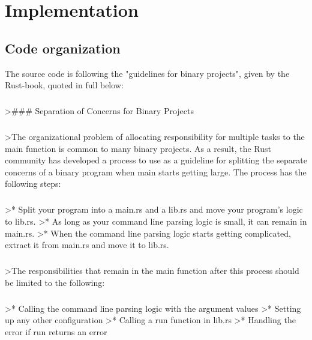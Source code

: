 \chapter{Implementation}

\section{Code organization}

The source code is following the "guidelines for binary projects", given by the Rust-book, quoted in full below:


\paragraph{}
>### Separation of Concerns for Binary Projects

\paragraph{}
>The organizational problem of allocating responsibility for multiple tasks to the main function is common to many binary projects. As a result, the Rust community has developed a process to use as a guideline for splitting the separate concerns of a binary program when main starts getting large. The process has the following steps:


\paragraph{}
>* Split your program into a main.rs and a lib.rs and move your program’s logic to lib.rs.
>* As long as your command line parsing logic is small, it can remain in main.rs.
>* When the command line parsing logic starts getting complicated, extract it from main.rs and move it to lib.rs.


\paragraph{}
>The responsibilities that remain in the main function after this process should be limited to the following:


\paragraph{}
>* Calling the command line parsing logic with the argument values
>* Setting up any other configuration
>* Calling a run function in lib.rs
>* Handling the error if run returns an error


